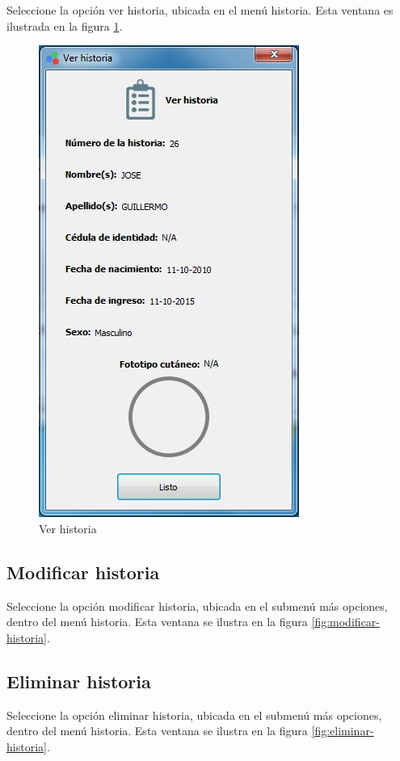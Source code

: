	Seleccione la opci\'{o}n ver historia, ubicada en el men\'{u} historia. Esta ventana es ilustrada en la figura \ref{fig:ver-historia}.
\vfill
\begin{figure}[H]
  \centering
  \includegraphics[width=.5\linewidth]{./img/ver-historia1.jpg}
\caption[]{Ver historia\label{fig:ver-historia}}
\end{figure}
\vfill
\newpage
	\subsection*{Modificar historia}
	
	Seleccione la opci\'{o}n modificar historia, ubicada en el submen\'{u} m\'{a}s opciones, dentro del men\'{u} historia. Esta ventana se ilustra en la figura \ref{fig:modificar-historia}.

	\subsection*{Eliminar historia}
	
	Seleccione la opci\'{o}n eliminar historia, ubicada en el submen\'{u} m\'{a}s opciones, dentro del men\'{u} historia. Esta ventana se ilustra en la figura \ref{fig:eliminar-historia}.
	
